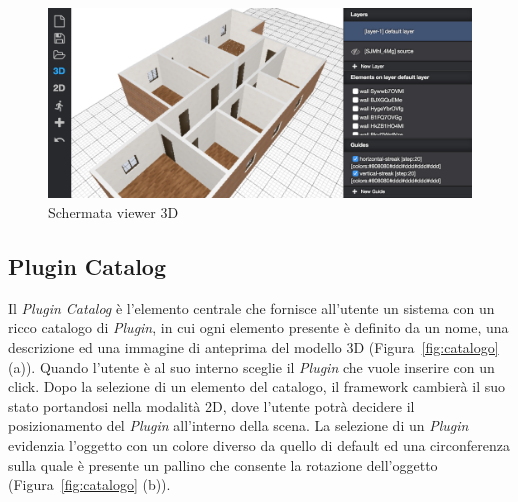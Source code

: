 \begin{figure}[htbp] %
   \centering
   \includegraphics[width=1\linewidth]{images/3d}
   \caption{Schermata viewer 3D }
   \label{fig:viewer3D}
\end{figure}
\newpage

\subsection{Plugin Catalog}
\label{sec:chapter_2_section_2_sub_3}

\noindent
 Il \emph{Plugin Catalog} \`e l'elemento centrale che fornisce all'utente un sistema con un ricco catalogo di \emph{Plugin},
 in cui ogni elemento presente \`e definito da un nome, una descrizione ed una
 immagine di anteprima del modello 3D (Figura~\ref{fig:catalogo} (a)). Quando l'utente \`e al suo interno
 sceglie il \emph{Plugin} che vuole inserire con un click.
 Dopo la selezione di un elemento del catalogo, il framework cambierà il suo stato portandosi nella modalit\`a 2D,
 dove l'utente potrà decidere il posizionamento del \emph{Plugin} all'interno della scena.
 La selezione di un \emph{Plugin} evidenzia l'oggetto con un colore diverso da quello di default ed una circonferenza sulla quale è presente un pallino
 che consente la rotazione dell'oggetto (Figura~\ref{fig:catalogo} (b)).

